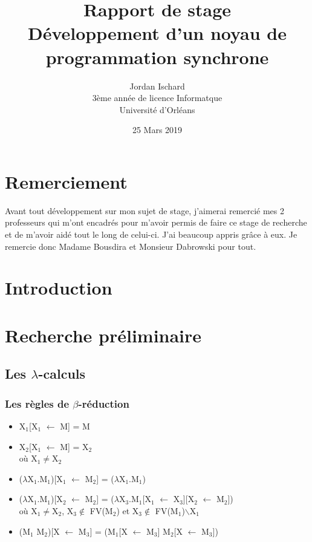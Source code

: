 \documentclass[10pt,a4paper]{article}
\begin{document}
		
	\title{\textbf{Rapport de stage \\ Développement d'un noyau de programmation synchrone}}
	\date{25 Mars 2019}
	\author{Jordan Ischard\\3ème année de licence Informatque \\ Université d'Orléans}
	\maketitle
	\newpage
	
	
	\tableofcontents
	\newpage
	
	\section{Remerciement}
		Avant tout développement sur mon sujet de stage, j'aimerai remercié mes 2 professeurs qui m'ont encadrés pour m'avoir permis de faire ce stage de recherche et de m'avoir aidé tout le long de celui-ci. J'ai beaucoup appris grâce à eux. Je remercie donc Madame Bousdira et Monsieur Dabrowski pour tout.
	\bigbreak
	
	\section{Introduction}

		
		
		
	
	
	\newpage
	\section{Recherche préliminaire}
		\subsection{Les  $\lambda$-calculs}
		
			\subsubsection{Les règles de $\beta$-réduction}
			\begin{itemize}
				\item X$_{1}$[X$_{1}$ $\leftarrow$ M] = M
				\item X$_{2}$[X$_{1}$ $\leftarrow$ M] = X$_{2}$ 
				\\où X$_{1}$$\neq$X$_{2}$
				\item ($\lambda$X$_{1}$.M$_{1}$)[X$_{1}$ $\leftarrow$ M$_{2}$] =  ($\lambda$X$_{1}$.M$_{1}$)
				\item ($\lambda$X$_{1}$.M$_{1}$)[X$_{2}$ $\leftarrow$ M$_{2}$] = ($\lambda$X$_{3}$.M$_{1}$[X$_{1}$ $\leftarrow$ X$_{3}$][X$_{2}$ $\leftarrow$ M$_{2}$]) 
				\\où X$_{1}$$\neq$X$_{2}$, X$_{3}$$\notin$ FV(M$_{2}$) 
				et X$_{3}$$\notin$ FV(M$_{1}$)$\backslash${X$_{1}$} 
				\item (M$_{1}$ M$_{2}$)[X $\leftarrow$ M$_{3}$] = 
				(M$_{1}$[X $\leftarrow$ M$_{3}$] M$_{2}$[X $\leftarrow$ M$_{3}$])
			\end{itemize}
			
\end{document}
